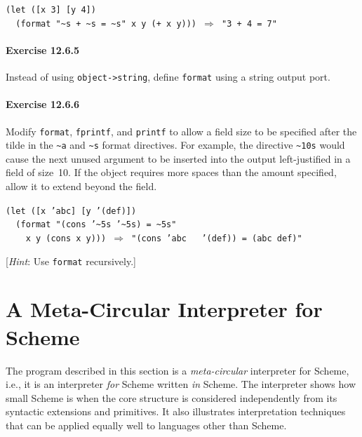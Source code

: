 \begin{alltt}
(let ([x 3] [y 4])
  (format "\~{}s + \~{}s = \~{}s" x y (+ x y))) \(\Rightarrow\) "3 + 4 = 7"
\end{alltt}

\paragraph{Exercise \label{examples_g185}12.6.5}


\label{examples_s44}Instead of using \texttt{object-\textgreater{}string}, define \texttt{format}
using a string output port.


\paragraph{Exercise \label{examples_g186}12.6.6}


\label{examples_s45}Modify \texttt{format}, \texttt{fprintf}, and \texttt{printf} to allow
a field size to be specified after the tilde in the \texttt{\~{}a} and
\texttt{\~{}s} format directives.
For example, the directive \texttt{\~{}10s} would cause the next unused
argument to be inserted into the output left-justified in a field of
size 10.
If the object requires more spaces than the amount specified, allow it
to extend beyond the field.


\begin{alltt}
(let ([x 'abc] [y '(def)])
  (format "(cons '\~{}5s '\~{}5s) = \~{}5s"
    x y (cons x y))) \(\Rightarrow\) "(cons 'abc   '(def)) = (abc def)"
\end{alltt}


[\textit{Hint}: Use \texttt{format} recursively.]


\section{\label{examples_g187}\label{examples_h7}A Meta-Circular Interpreter for Scheme\label{examples_SECTEXINTERPRET}}



The program described in this section is a
\label{examples_s46}\label{examples_s47}\textit{meta-circular}
\label{examples_s48}interpreter for Scheme, i.e.,
it is an interpreter \textit{for} Scheme written \textit{in} Scheme.
The interpreter shows how small Scheme is when the core
structure is considered independently from its syntactic extensions
and primitives.
It also illustrates interpretation techniques that can be applied
equally well to languages other than Scheme.


